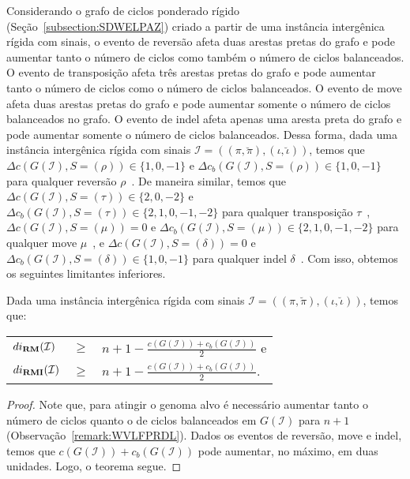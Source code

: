 Considerando o grafo de ciclos ponderado rígido (Seção~\ref{subsection:SDWELPAZ}) criado a partir de uma instância intergênica rígida com sinais, o evento de reversão afeta duas arestas pretas do grafo e pode aumentar tanto o número de ciclos como também o número de ciclos balanceados. O evento de transposição afeta três arestas pretas do grafo e pode aumentar tanto o número de ciclos como o número de ciclos balanceados. O evento de move afeta duas arestas pretas do grafo e pode aumentar somente o número de ciclos balanceados no grafo. O evento de indel afeta apenas uma aresta preta do grafo e pode aumentar somente o número de ciclos balanceados. Dessa forma, dada uma instância intergênica rígida com sinais $\mathcal{I} = ((\pi,\breve\pi),(\iota,\breve\iota))$, temos que $\Delta c(G(\mathcal{I}), S=(\rho)) \in \{1,0,-1\}$ e $\Delta c_b(G(\mathcal{I}), S=(\rho)) \in \{1,0,-1\}$ para qualquer reversão $\rho$~\cite{1996-bafna-pevzner,2021b-oliveira-etal}. De maneira similar, temos que $\Delta c(G(\mathcal{I}), S=(\tau)) \in \{2,0,-2\}$ e $\Delta c_b(G(\mathcal{I}), S=(\tau)) \in \{2,1,0,{-1},{-2}\}$ para qualquer transposição $\tau$~\cite{1998-bafna-pevzner,2021a-oliveira-etal}, $\Delta c(G(\mathcal{I}), S=(\mu)) = 0$ e $\Delta c_b(G(\mathcal{I}), S=(\mu)) \in \{2,1,0,{-1},{-2}\}$ para qualquer move $\mu$~\cite{2021a-oliveira-etal}, e $\Delta c(G(\mathcal{I}), S=(\delta)) = 0$ e $\Delta c_b(G(\mathcal{I}), S=(\delta)) \in \{1,0,{-1}\}$ para qualquer indel $\delta$~\cite{2021b-oliveira-etal}. Com isso, obtemos os seguintes limitantes inferiores.

\begin{theorem}\label{theorem:OCNPWYNL}
Dada uma instância intergênica rígida com sinais $\mathcal{I} = ((\pi,\breve\pi),(\iota,\breve\iota))$, temos que:

\begin{tabular}{lll}
  $di_{\textbf{RM}}(\mathcal{I})$       & $ \ge $ & ${n + 1} - \frac{c(G(\mathcal{I})) + c_b(G(\mathcal{I}))}{2}$ e \\
  $di_{\textbf{RMI}}(\mathcal{I})$    & $ \ge $ & ${n + 1} - \frac{c(G(\mathcal{I})) + c_b(G(\mathcal{I}))}{2}$.    \\
\end{tabular}
\end{theorem}
\begin{proof}
Note que, para atingir o genoma alvo é necessário aumentar tanto o número de ciclos quanto o de ciclos balanceados em $G(\mathcal{I})$ para $n+1$ (Observação~\ref{remark:WVLFPRDL}). Dados os eventos de reversão, move e indel, temos que $c(G(\mathcal{I})) + c_b(G(\mathcal{I}))$ pode aumentar, no máximo, em duas unidades. Logo, o teorema segue.
\end{proof}

